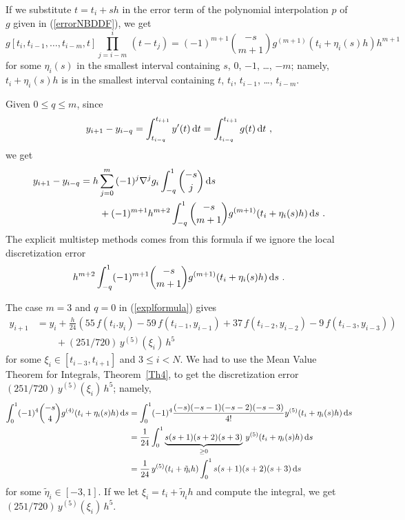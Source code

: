 If we substitute $t=t_i + sh$ in the error term of the polynomial
interpolation $p$ of $g$ given in (\ref{errorNBDDF}), we get
\[
g[t_i,t_{i-1},\ldots,t_{i-m},t]\prod_{j=i-m}^i\,(t-t_j) =
(-1)^{m+1} \binom{-s}{m+1} g^{(m+1)}(t_i+\eta_i(s) h) h^{m+1}
\]
for some $\eta_i(s)$ in the smallest interval containing $s$, $0$,
$-1$, \ldots, $-m$; namely, $t_i+\eta_i(s)h$ is in the smallest
interval containing $t$, $t_i$, $t_{i-1}$, \ldots , $t_{i-m}$.

Given $0\leq q \leq m$, since
\[
y_{i+1} - y_{i-q} = \int_{t_{i-q}}^{t_{i+1}} y'(t) \,\mathrm{d}t
= \int_{t_{i-q}}^{t_{i+1}} g(t)\,\mathrm{d}t \ ,
\]
we get
\begin{equation} \label{explformula}
\begin{split}
y_{i+1} - y_{i-q} &
= h \sum_{j=0}^m\,(-1)^j \nabla^j g_i \int_{-q}^1  \binom{-s}{j} \,\mathrm{d}s \\
&\qquad  + (-1)^{m+1}  h^{m+2}\int_{-q}^1 \binom{-s}{m+1}
g^{(m+1)}(t_i+\eta_i(s)h) \,\mathrm{d}s \ .
\end{split}
\end{equation}
The explicit multistep methods comes from this formula if we ignore
the local discretization error
\[
h^{m+2}\int_{-q}^1 (-1)^{m+1} \binom{-s}{m+1} g^{(m+1)}(t_i+\eta_i(s)h) \,\mathrm{d}s \ .
\]

The case $m=3$ and $q=0$ in (\ref{explformula}) gives
\begin{align*}
y_{i+1} & = y_i + \frac{h}{24} \left( 55 \, f(t_i.y_i) - 59 \,
f(t_{i-1},y_{i-1}) + 37\, f(t_{i-2},y_{i-2}) - 9 \,f(t_{i-3},y_{i-3})
\right) \\
&\qquad + (251/720)\,y^{(5)}(\xi_i)\,h^5
\end{align*} 
for some $\xi_i \in [t_{i-3},t_{i+1}]$ and $3 \leq i < N$.
We had to use the Mean Value Theorem for Integrals, Theorem~\ref{Th4},
to get the discretization error $(251/720)\,y^{(5)}(\xi_i)\,h^5$; namely,
\begin{align*}
\int_0^1 (-1)^4 \binom{-s}{4} g^{(4)}(t_i+\eta_i(s)h) \,\mathrm{d}s
&=
\int_0^1 (-1)^4 \frac{(-s)(-s-1)(-s-2)(-s-3)}{4!}
y^{(5)}(t_i+\eta_i(s)h) \,\mathrm{d}s \\
&= \frac{1}{24} \int_0^1 \underbrace{s(s+1)(s+2)(s+3)}_{\geq 0} \,
y^{(5)}(t_i+\eta_i(s)h) \,\mathrm{d}s \\
&= \frac{1}{24}\, y^{(5)}(t_i+\tilde{\eta}_ih) \int_0^1 s(s+1)(s+2)(s+3) \,\mathrm{d}s
\end{align*}
for some $\tilde{\eta}_i \in [-3,1]$.
If we let $\xi_i = t_i+\tilde{\eta}_i h$ and compute the integral, we get\\
$(251/720)\,y^{(5)}(\xi_i)\,h^5$.

